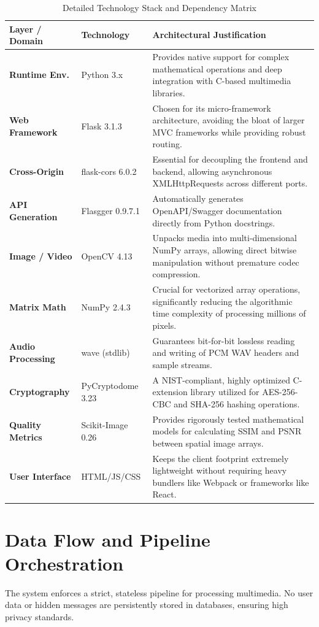 \documentclass[12pt,a4paper]{report}
\begin{document}
\begin{table}[H]
\centering
\caption{Detailed Technology Stack and Dependency Matrix}
\label{tab:tech_stack}
\begin{tabular}{@{}llp{8cm}@{}}
\toprule
\textbf{Layer / Domain} & \textbf{Technology} & \textbf{Architectural Justification} \\
\midrule
\textbf{Runtime Env.} & Python 3.x & Provides native support for complex mathematical operations and deep integration with C-based multimedia libraries. \\
\textbf{Web Framework} & Flask 3.1.3 & Chosen for its micro-framework architecture, avoiding the bloat of larger MVC frameworks while providing robust routing. \\
\textbf{Cross-Origin} & flask-cors 6.0.2 & Essential for decoupling the frontend and backend, allowing asynchronous XMLHttpRequests across different ports. \\
\textbf{API Generation} & Flasgger 0.9.7.1 & Automatically generates OpenAPI/Swagger documentation directly from Python docstrings. \\
\textbf{Image / Video} & OpenCV 4.13 & Unpacks media into multi-dimensional NumPy arrays, allowing direct bitwise manipulation without premature codec compression. \\
\textbf{Matrix Math} & NumPy 2.4.3 & Crucial for vectorized array operations, significantly reducing the algorithmic time complexity of processing millions of pixels. \\
\textbf{Audio Processing} & wave (stdlib) & Guarantees bit-for-bit lossless reading and writing of PCM WAV headers and sample streams. \\
\textbf{Cryptography} & PyCryptodome 3.23 & A NIST-compliant, highly optimized C-extension library utilized for AES-256-CBC and SHA-256 hashing operations. \\
\textbf{Quality Metrics} & Scikit-Image 0.26 & Provides rigorously tested mathematical models for calculating SSIM and PSNR between spatial image arrays. \\
\textbf{User Interface} & HTML/JS/CSS & Keeps the client footprint extremely lightweight without requiring heavy bundlers like Webpack or frameworks like React. \\
\bottomrule
\end{tabular}
\end{table}

\section{Data Flow and Pipeline Orchestration}
The system enforces a strict, stateless pipeline for processing multimedia. No user data or hidden messages are persistently stored in databases, ensuring high privacy standards.
\end{document}
